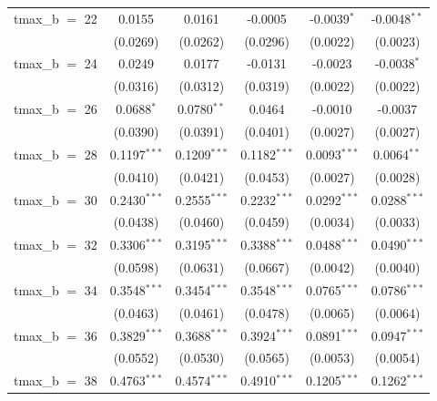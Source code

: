 \begin{tabular}{lccccc}
   tmax\_b $=$ 22       & 0.0155             & 0.0161             & -0.0005         & -0.0039$^{*}$   & -0.0048$^{**}$\\   
                        & (0.0269)           & (0.0262)           & (0.0296)        & (0.0022)        & (0.0023)\\   
   tmax\_b $=$ 24       & 0.0249             & 0.0177             & -0.0131         & -0.0023         & -0.0038$^{*}$\\   
                        & (0.0316)           & (0.0312)           & (0.0319)        & (0.0022)        & (0.0022)\\   
   tmax\_b $=$ 26       & 0.0688$^{*}$       & 0.0780$^{**}$      & 0.0464          & -0.0010         & -0.0037\\   
                        & (0.0390)           & (0.0391)           & (0.0401)        & (0.0027)        & (0.0027)\\   
   tmax\_b $=$ 28       & 0.1197$^{***}$     & 0.1209$^{***}$     & 0.1182$^{***}$  & 0.0093$^{***}$  & 0.0064$^{**}$\\   
                        & (0.0410)           & (0.0421)           & (0.0453)        & (0.0027)        & (0.0028)\\   
   tmax\_b $=$ 30       & 0.2430$^{***}$     & 0.2555$^{***}$     & 0.2232$^{***}$  & 0.0292$^{***}$  & 0.0288$^{***}$\\   
                        & (0.0438)           & (0.0460)           & (0.0459)        & (0.0034)        & (0.0033)\\   
   tmax\_b $=$ 32       & 0.3306$^{***}$     & 0.3195$^{***}$     & 0.3388$^{***}$  & 0.0488$^{***}$  & 0.0490$^{***}$\\   
                        & (0.0598)           & (0.0631)           & (0.0667)        & (0.0042)        & (0.0040)\\   
   tmax\_b $=$ 34       & 0.3548$^{***}$     & 0.3454$^{***}$     & 0.3548$^{***}$  & 0.0765$^{***}$  & 0.0786$^{***}$\\   
                        & (0.0463)           & (0.0461)           & (0.0478)        & (0.0065)        & (0.0064)\\   
   tmax\_b $=$ 36       & 0.3829$^{***}$     & 0.3688$^{***}$     & 0.3924$^{***}$  & 0.0891$^{***}$  & 0.0947$^{***}$\\   
                        & (0.0552)           & (0.0530)           & (0.0565)        & (0.0053)        & (0.0054)\\   
   tmax\_b $=$ 38       & 0.4763$^{***}$     & 0.4574$^{***}$     & 0.4910$^{***}$  & 0.1205$^{***}$  & 0.1262$^{***}$\\   

\end{tabular}
